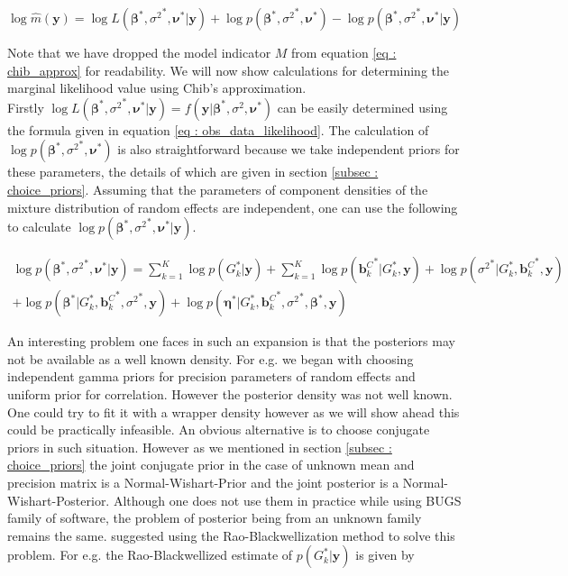 \begin{equation}
\label{eq : chib_approx}
\log{\hat{m}(\boldsymbol{y})} = \log{L({\boldsymbol{\beta}}^*, {\sigma^2}^*, \boldsymbol{\nu}^*|\boldsymbol{y})} + \log{p({\boldsymbol{\beta}}^*, {\sigma^2}^*, \boldsymbol{\nu}^*)} - \log{p({\boldsymbol{\beta}}^*, {\sigma^2}^*, \boldsymbol{\nu}^*|\boldsymbol{y})}
\end{equation}

Note that we have dropped the model indicator $M$ from equation \ref{eq : chib_approx} for readability. We will now show calculations for determining the marginal likelihood value using Chib's approximation.\\ 

Firstly $\log{L({\boldsymbol{\beta}}^*, {\sigma^2}^*, \boldsymbol{\nu}^*|\boldsymbol{y})} = f(\boldsymbol{y}|{\boldsymbol{\beta}}^*, \sigma^2, {\boldsymbol{\nu}}^*)$ can be easily determined using the formula given in equation \ref{eq : obs_data_likelihood}. The calculation of $\log{p({\boldsymbol{\beta}}^*, {\sigma^2}^*, \boldsymbol{\nu}^*)}$ is also straightforward because we take independent priors for these parameters, the details of which are given in section \ref{subsec : choice_priors}. Assuming that the parameters of component densities of the mixture distribution of random effects are independent, one can use the following to calculate $\log{p({\boldsymbol{\beta}}^*, {\sigma^2}^*, \boldsymbol{\nu}^*|\boldsymbol{y})}$.

\begin{multline}
\log{p({\boldsymbol{\beta}}^*, {\sigma^2}^*, \boldsymbol{\nu}^*|\boldsymbol{y})} = 
\sum_{k=1}^K{\log{p(G_k^*|\boldsymbol{y})}} + 
\sum_{k=1}^K{\log{p({\boldsymbol{b}_k^C}^*|G_k^*, \boldsymbol{y})}} + 
\log{p({\sigma^2}^*|G_k^*, {\boldsymbol{b}_k^C}^*, \boldsymbol{y})}\\
+ \log{p({\boldsymbol{\beta}}^*|G_k^*, {\boldsymbol{b}_k^C}^*, {\sigma^2}^*, \boldsymbol{y})} + 
\log{p({\boldsymbol{\eta}}^*|G_k^*, {\boldsymbol{b}_k^C}^*, {\sigma^2}^*,{\boldsymbol{\beta}}^*, \boldsymbol{y})}
\end{multline}

An interesting problem one faces in such an expansion is that the posteriors may not be available as a well known density. For e.g. we began with choosing independent gamma priors for precision parameters of random effects and uniform prior for correlation. However the posterior density was not well known. One could try to fit it with a wrapper density however as we will show ahead this could be practically infeasible. An obvious alternative is to choose conjugate priors in such situation. However as we mentioned in section \ref{subsec : choice_priors} the joint conjugate prior in the case of unknown mean and precision matrix is a Normal-Wishart-Prior and the joint posterior is a Normal-Wishart-Posterior. Although one does not use them in practice while using BUGS family of software, the problem of posterior being from an unknown family remains the same. \citet{chib_marginal_1995} suggested using the Rao-Blackwellization method to solve this problem. For e.g. the Rao-Blackwellized estimate of $p(G_k^*|\boldsymbol{y})$ is given by

